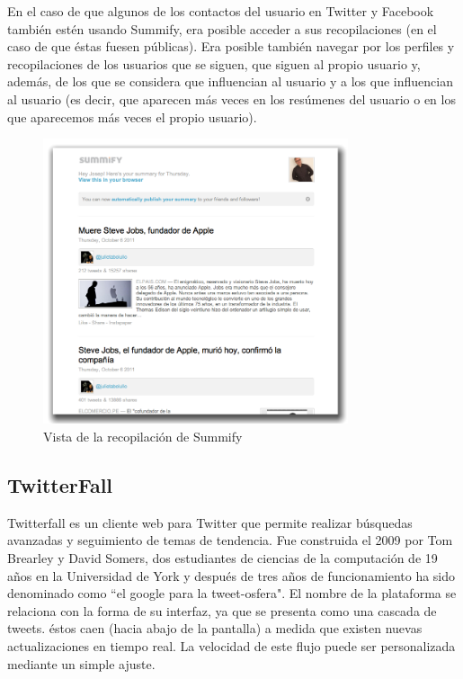 En el caso de que algunos de los contactos del usuario en Twitter y Facebook también estén usando Summify, era posible acceder a sus recopilaciones (en el caso de que éstas fuesen públicas). Era posible también navegar por los perfiles y recopilaciones de los usuarios que se siguen, que siguen al propio usuario y, además, de los que se considera que influencian al usuario y a los que influencian al usuario (es decir, que aparecen más veces en los resúmenes del usuario o en los que aparecemos más veces el propio usuario).

\begin{figure}[H]
  \centering
    \includegraphics[width=0.8\textwidth]{imgs/summify.png}
  \caption{Vista de la recopilación de Summify}
  \label{fig:summify}
\end{figure}

\subsection{TwitterFall}

Twitterfall \cite{twitterfall} es un cliente web para Twitter que permite realizar búsquedas avanzadas y seguimiento de temas de tendencia. Fue construida el 2009 por Tom Brearley y David Somers, dos estudiantes de ciencias de la computación de 19 años en la Universidad de York y después de tres años de funcionamiento ha sido denominado como ``el google para la tweet-osfera". El nombre de la plataforma se relaciona con la forma de su interfaz, ya que se presenta como una cascada de tweets. éstos caen (hacia abajo de la pantalla) a medida que existen nuevas actualizaciones en tiempo real. La velocidad de este flujo puede ser personalizada mediante un simple ajuste.


